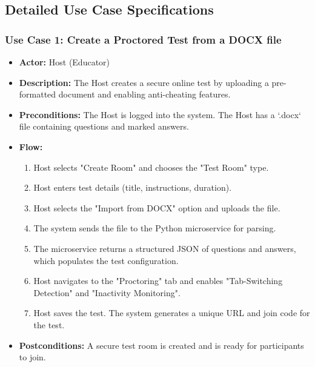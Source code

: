 \FloatBarrier
\subsection{Detailed Use Case Specifications}

\subsubsection{Use Case 1: Create a Proctored Test from a DOCX file}
\begin{itemize}
    \item \textbf{Actor:} Host (Educator)
    \item \textbf{Description:} The Host creates a secure online test by uploading a pre-formatted document and enabling anti-cheating features.
    \item \textbf{Preconditions:} The Host is logged into the system. The Host has a `.docx` file containing questions and marked answers.
    \item \textbf{Flow:}
    \begin{enumerate}
        \item Host selects "Create Room" and chooses the "Test Room" type.
        \item Host enters test details (title, instructions, duration).
        \item Host selects the "Import from DOCX" option and uploads the file.
        \item The system sends the file to the Python microservice for parsing.
        \item The microservice returns a structured JSON of questions and answers, which populates the test configuration.
        \item Host navigates to the "Proctoring" tab and enables "Tab-Switching Detection" and "Inactivity Monitoring".
        \item Host saves the test. The system generates a unique URL and join code for the test.
    \end{enumerate}
    \item \textbf{Postconditions:} A secure test room is created and is ready for participants to join.
\end{itemize}

\vspace{1cm}

